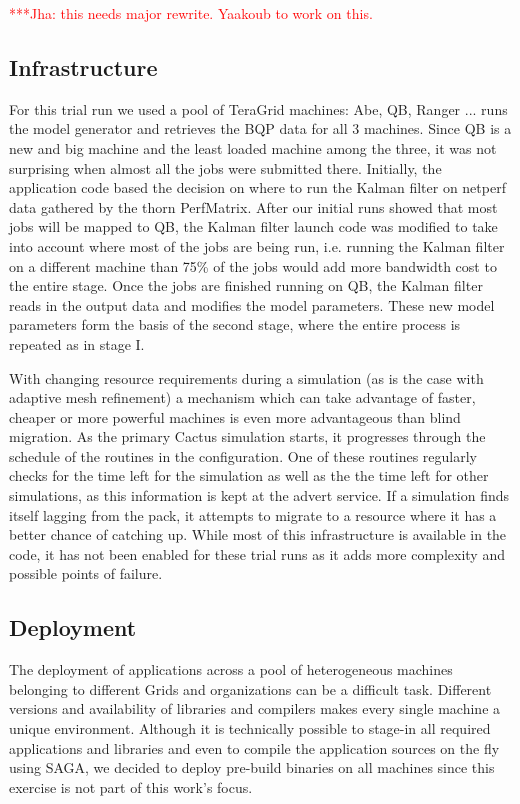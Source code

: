 \documentclass[conference,final]{IEEEtran}
\newcommand{\jhanote}[1]{ {\textcolor{red} { ***Jha: #1 }}}
\begin{document}
\jhanote{this needs major rewrite. Yaakoub to work on this.}

\subsection{Infrastructure}
For this trial run we used a pool of TeraGrid machines: Abe, QB,
Ranger ...  runs the model generator and retrieves the BQP data for
all 3 machines.  Since QB is a new and big machine and the least
loaded machine among the three, it was not surprising when almost all
the jobs were submitted there.  Initially, the application code based
the decision on where to run the Kalman filter on netperf data
gathered by the thorn PerfMatrix. After our initial runs showed that
most jobs will be mapped to QB, the Kalman filter launch code was
modified to take into account where most of the jobs are being run,
i.e. running the Kalman filter on a different machine than 75\% of the
jobs would add more bandwidth cost to the entire stage. Once the jobs
are finished running on QB, the Kalman filter reads in the output data
and modifies the model parameters. These new model parameters form the
basis of the second stage, where the entire process is repeated as in
stage I.

With changing resource requirements during a simulation (as is the
case with adaptive mesh refinement) a mechanism which can take
advantage of faster, cheaper or more powerful machines is even more
advantageous than blind migration. As the primary Cactus simulation
starts, it progresses through the schedule of the routines in the
configuration. One of these routines regularly checks for the time
left for the simulation as well as the the time left for other
simulations, as this information is kept at the advert service. If a
simulation finds itself lagging from the pack, it attempts to migrate
to a resource where it has a better chance of catching up. While most
of this infrastructure is available in the code, it has not been
enabled for these trial runs as it adds more complexity and possible
points of failure.


\subsection{Deployment}
The deployment of applications across a pool of heterogeneous machines
belonging to different Grids and organizations can be a difficult
task. Different versions and availability of libraries and compilers
makes every single machine a unique environment. Although it is
technically possible to stage-in all required applications and
libraries and even to compile the application sources on the fly using
SAGA, we decided to deploy pre-build binaries on all machines since
this exercise is not part of this work's focus.
\end{document}
